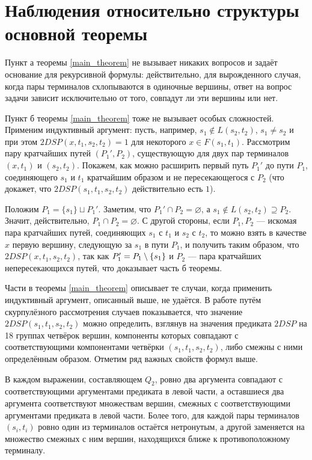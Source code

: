 \chapter{Наблюдения относительно структуры основной теоремы}

Пункт а теоремы \ref{main_theorem} не вызывает никаких вопросов и задаёт основание для рекурсивной формулы: действительно, для вырожденного случая, когда пары терминалов схлопываются в одиночные вершины, ответ на вопрос задачи зависит исключительно от того, совпадут ли эти вершины или нет.

Пункт б теоремы \ref{main_theorem} тоже не вызывает особых сложностей. Применим индуктивный аргумент: пусть, например, $s_1 \notin L(s_2, t_2)$, $s_1 \neq s_2$ и при этом $2DSP(x, t_1, s_2, t_2) = 1$ для некоторого $x \in F(s_1, t_1)$. Рассмотрим пару кратчайших путей $(P_1', P_2)$, существующую для двух пар терминалов $(x, t_1)$ и $(s_2, t_2)$. Покажем, как можно расширить первый путь $P_1'$ до пути $P_1$, соединяющего $s_1$ и $t_1$ кратчайшим образом и не пересекающегося с $P_2$ (что докажет, что $2DSP(s_1, t_1, s_2, t_2)$ действительно есть $1$).

Положим $P_1 = \{s_1\} \sqcup P_1'$. Заметим, что $P_1' \cap P_2 = \varnothing$, а $s_1 \notin L(s_2, t_2) \supseteq P_2$. Значит, действительно, $P_1 \cap P_2 = \varnothing$. С другой стороны, если $P_1, P_2$ --- искомая пара кратчайших путей, соединяющих $s_1$ с $t_1$ и $s_2$ с $t_2$, то можно взять в качестве $x$ первую вершину, следующую за $s_1$ в пути $P_1$, и получить таким образом, что $2DSP(x, t_1, s_2, t_2)$, так как $P_1' = P_1 \setminus \{s_1\}$ и $P_2$ --- пара кратчайших непересекающихся путей, что доказывает часть б теоремы.

Части в теоремы \ref{main_theorem} описывает те случаи, когда применить индуктивный аргумент, описанный выше, не удаётся. В работе \cite{ET} путём скурпулёзного рассмотрения случаев показывается, что значение $2DSP(s_1, t_1, s_2, t_2)$ можно определить, взглянув на значения предиката $2DSP$ на 18 группах четвёрок вершин, компоненты которых совпадают с соответствующими компонентами четвёрки $(s_1, t_1, s_2, t_2)$, либо смежны с ними определённым образом. Отметим ряд важных свойств формул выше.

\begin{proposition} \label{q2_structure}
В каждом выражении, составляющем $Q_2$, ровно два аргумента совпадают с соответствующими аргументами предиката в левой части, а оставшиеся два аргумента соответствуют множествам вершин, смежных с соответствующими аргументами предиката в левой части. Более того, для каждой пары терминалов $(s_i, t_i)$ ровно один из терминалов остаётся нетронутым, а другой заменяется на множество смежных с ним вершин, находящихся ближе к противоположному терминалу.
\end{proposition}

